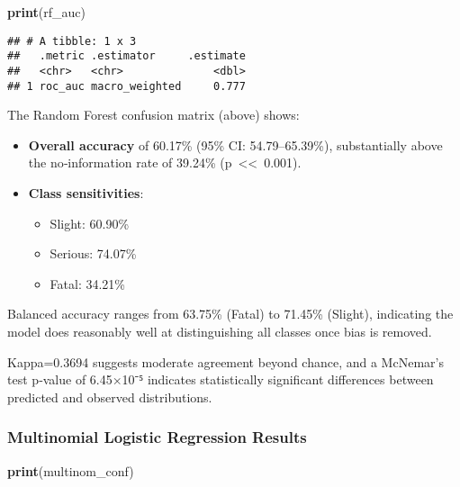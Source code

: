\documentclass[
]{article}
\newenvironment{Shaded}{\begin{snugshade}}{\end{snugshade}}
\newcommand{\FunctionTok}[1]{\textcolor[rgb]{0.13,0.29,0.53}{\textbf{#1}}}
\newcommand{\NormalTok}[1]{#1}
\providecommand{\tightlist}{%
  \setlength{\itemsep}{0pt}\setlength{\parskip}{0pt}}
\begin{document}
\begin{Shaded}
\begin{Highlighting}[]
\FunctionTok{print}\NormalTok{(rf\_auc)}
\end{Highlighting}
\end{Shaded}

\begin{verbatim}
## # A tibble: 1 x 3
##   .metric .estimator     .estimate
##   <chr>   <chr>              <dbl>
## 1 roc_auc macro_weighted     0.777
\end{verbatim}

The Random Forest confusion matrix (above) shows:

\begin{itemize}
\tightlist
\item
  \textbf{Overall accuracy} of 60.17\% (95\% CI: 54.79--65.39\%),
  substantially above the no‐information rate of 39.24\%
  (p~\textless\textless~0.001).
\item
  \textbf{Class sensitivities}:

  \begin{itemize}
  \tightlist
  \item
    Slight: 60.90\%
  \item
    Serious: 74.07\%
  \item
    Fatal: 34.21\%
  \end{itemize}
\end{itemize}

Balanced accuracy ranges from 63.75\% (Fatal) to 71.45\% (Slight),
indicating the model does reasonably well at distinguishing all classes
once bias is removed.

Kappa=0.3694 suggests moderate agreement beyond chance, and a McNemar's
test p‑value of 6.45×10⁻⁵ indicates statistically significant
differences between predicted and observed distributions.

\subsubsection{Multinomial Logistic Regression
Results}\label{multinomial-logistic-regression-results}

\begin{Shaded}
\begin{Highlighting}[]
\FunctionTok{print}\NormalTok{(multinom\_conf)}
\end{Highlighting}
\end{Shaded}
\end{document}
